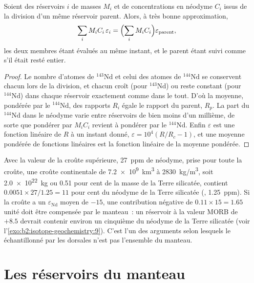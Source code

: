 \begin{proposition}\label{prop:b2:isotope-geochemistry:mass-balance}
Soient des réservoirs $i$ de masses $M_i$ et de concentrations en néodyme $C_i$ issus
de la division d'un même réservoir parent. Alors, à très bonne approximation,
\[
  \sum_i M_i C_i\, \varepsilon_i = \Bigl(\sum_i M_i C_i\Bigr) \varepsilon_{\text{parent}},
\]
les deux membres étant évalués au même instant, et le parent étant suivi comme s'il
était resté entier.
\end{proposition}

\begin{proof}
Le nombre d'atomes de $^{143}\mathrm{Nd}$ et celui des atomes de $^{144}\mathrm{Nd}$
se conservent chacun lors de la division, et chacun croît (pour
$^{143}\mathrm{Nd}$) ou reste constant (pour $^{144}\mathrm{Nd}$) dans chaque réservoir
exactement comme dans le tout. D'où la moyenne, pondérée par le $^{144}\mathrm{Nd}$, des rapports $R_i$
égale le rapport du parent, $R_p$. La part du $^{144}\mathrm{Nd}$
dans le néodyme varie entre réservoirs de bien moins d'un millième, de sorte que
pondérer par $M_iC_i$ revient à pondérer par le $^{144}\mathrm{Nd}$. Enfin $\varepsilon$ est une
fonction linéaire de $R$ à un instant donné, $\varepsilon = 10^4(R/R_c - 1)$, et une
moyenne pondérée de fonctions linéaires est la fonction linéaire de la moyenne pondérée.
\end{proof}

Avec la valeur de la croûte supérieure, \qty{27}{ppm} de néodyme, prise pour toute la
croûte, une croûte continentale de \qty{7.2e9}{km^3} à \qty{2830}{kg/m^3}, soit
\qty{2.0e22}{kg} ou 0.51 pour cent de la masse de la Terre silicatée, contient
$0.0051\times27/1.25 = 11$ pour cent du néodyme de la Terre silicatée (,
\qty{1.25}{ppm}). Si la croûte a un $\varepsilon_{\mathrm{Nd}}$ moyen de
$-15$, une contribution négative de $0.11\times15 = 1.65$ unité doit être
compensée par le manteau~: un réservoir à la valeur MORB de $+8.5$ devrait contenir
environ un cinquième du néodyme de la Terre silicatée (voir l'\cref{exo:b2:isotope-geochemistry:9}). C'est l'un des
arguments selon lesquels le  échantillonné par les dorsales n'est pas l'ensemble du
manteau.

\section{Les réservoirs du manteau}

